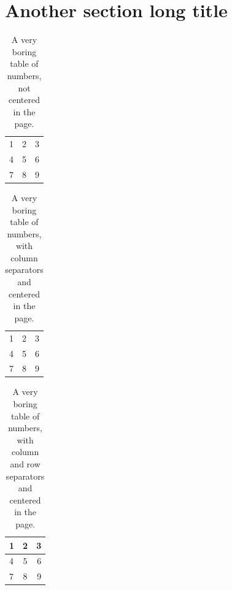 \documentclass{article}
\begin{document}
\clearpage %


\section[Another section short title]{Another section long title}

\begin{table}[t] %
\begin{tabular}{ l c r }
  1 & 2 & 3 \\
  4 & 5 & 6 \\
  7 & 8 & 9 \\
\end{tabular}
\caption{A very boring table of numbers, not centered in the page.}
\end{table}

\begin{table}[t] %
\centering %
\begin{tabular}{ l | c | r }
  1 & 2 & 3 \\
  4 & 5 & 6 \\
  7 & 8 & 9 \\
\end{tabular}
\caption{A very boring table of numbers, with column separators and centered in the page.}
\end{table}

\begin{table}[ht] %
\centering %
\begin{tabular}{ |l | c | r| }
  \hline			
  1 & 2 & 3 \\
  \hline
  4 & 5 & 6 \\
  \hline
  7 & 8 & 9 \\
  \hline  
\end{tabular}
\caption{A very boring table of numbers, with column and row separators and centered in the page.}
\end{table}
\end{document}
